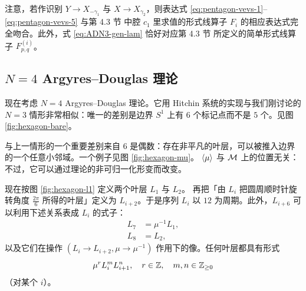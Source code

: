 注意，若作识别 $Y \to X_{-\gamma_1}$ 与 $X \to X_{\gamma_2}$，则表达式 \eqref{eq:pentagon-vevs-1}--\eqref{eq:pentagon-vevs-5} 与第 4.3 节%
中腔 $c_1$ 里求值的形式线算子 $F_i$ 的相应表达式完全吻合。此外，式 \eqref{eq:ADN3-gen-lam} 恰好对应第 4.3 节%
所定义的简单形式线算子 $F_{p,q}^{(i)}$。

\subsection{$N = 4$ Argyres--Douglas 理论}

现在考虑 $N=4$ Argyres--Douglas 理论。它用 Hitchin 系统的实现与我们刚讨论的 $N=3$ 情形非常相似：唯一的差别是边界 $S^1$ 上有 $6$ 个标记点而不是 $5$ 个。见图 \ref{fig:hexagon-bare}。

与上一情形的一个重要差别来自 $6$ 是偶数：存在非平凡的叶层，可以被推入边界的一个任意小邻域。一个例子见图 \ref{fig:hexagon-mu}。
$\langle \mu \rangle$ 与 $\mathcal{M}$ 上的位置无关：不过，它可以通过理论的非可归一化形变而改变。

现在按图 \ref{fig:hexagon-l1} 定义两个叶层 $L_1$ 与 $L_2$。
再把「由 $L_i$ 把圆周顺时针旋转角度 $\frac{2 \pi}{6}$ 所得的叶层」定义为 $L_{i+2}$。于是序列 $L_i$ 以 $12$ 为周期。此外，$L_{i+6}$ 可以利用下述关系表成 $L_i$ 的式子：
\begin{align}
L_7 &= \mu^{-1} L_1, \\
L_8 &= L_2,
\end{align}
以及它们在操作 $(L_i \to L_{i+2}, \mu \to \mu^{-1})$ 作用下的像。任何叶层都具有形式
\begin{equation}
\mu^r L_i^m L_{i+1}^n, \quad r \in \mathbb{Z}, \quad m, n \in \mathbb{Z}_{\ge 0}
\end{equation}
（对某个 $i$）。


